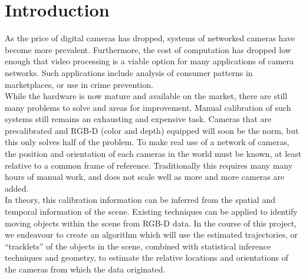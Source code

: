 \documentclass[journal]{IEEEtran}
\begin{document}
\section{Introduction}
	\indent As the price of digital cameras has dropped, systems of networked cameras have become more prevalent. Furthermore, the cost of computation has dropped low enough that video processing is a viable option for many applications of camera networks. Such applications include analysis of consumer patterns in marketplaces, or use in crime prevention. \\
	\indent While the hardware is now mature and available on the market, there are still many problems to solve and areas for improvement. Manual calibration of such systems still remains an exhausting and expensive task. Cameras that are precalibrated and RGB-D (color and depth) equipped will soon be the norm, but this only solves half of the problem. To make real use of a network of cameras, the position and orientation of each cameras in the world must be known, at least relative to a common frame of reference. Traditionally this requires many many hours of manual work, and does not scale well as more and more cameras are added. \\
	\indent In theory, this calibration information can be inferred from the spatial and temporal information of the scene. Existing techniques can be applied to identify moving objects within the scene from RGB-D data. In the course of this project, we endeavour to create an algorithm which will use the estimated trajectories, or “tracklets” of the objects in the scene, combined with statistical inference techniques and geometry, to estimate the relative locations and orientations of the cameras from which the data originated.

\end{document}

